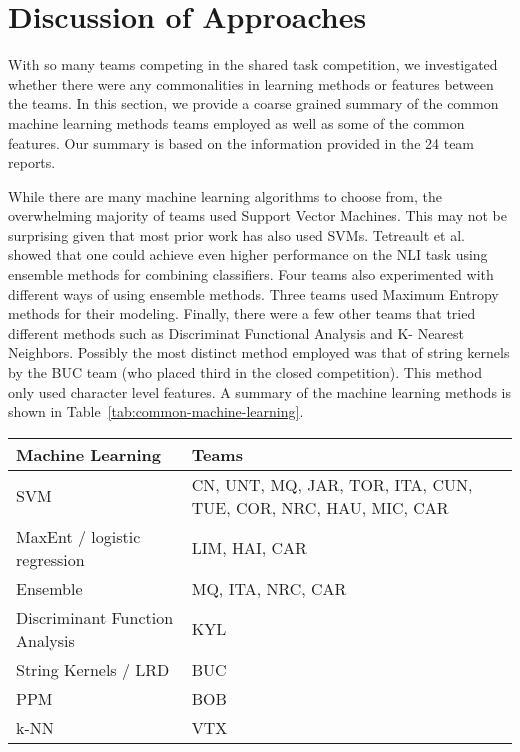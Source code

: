 \documentclass[11pt,letterpaper]{article}
\begin{document}
\section{Discussion of Approaches}
\label{sec-commonalities}
With so many teams competing in the shared task competition, we investigated
whether there were any commonalities in learning methods or features
between the teams.  In this section, we provide a coarse grained summary
of the common machine learning methods teams employed as well as some of
the common features.  Our summary is based on the information provided
in the 24 team reports.

While there are many machine learning algorithms to choose from, the overwhelming
majority of teams used Support Vector Machines.  This may not be surprising
given that most prior work has also used SVMs.  Tetreault et al.
 showed that one could achieve even higher
performance on the NLI task using ensemble methods for combining classifiers.
Four teams also experimented with different ways of using ensemble methods.
Three teams used Maximum Entropy methods for their modeling.
Finally, there were a few other teams that tried different methods such as
Discriminat Functional Analysis and K- Nearest Neighbors.  Possibly the most
distinct method employed was that of string kernels by the BUC team (who placed
third in the closed competition).  This method only used character level features.  
A summary of the machine learning methods is shown in Table~\ref{tab:common-machine-learning}.


\begin{table*}[!ht]
\begin{small}
\begin{tabular}{|l|p{10.5cm}|}
\hline
{\bf Machine Learning} & {\bf Teams} \\  \hline
SVM                    & CN, UNT, MQ, JAR, TOR, ITA, CUN, TUE, COR, NRC, HAU, MIC, CAR  \\ \hline
MaxEnt / logistic regression                 & LIM, HAI, CAR  \\ \hline
Ensemble               & MQ, ITA, NRC, CAR           \\ \hline
Discriminant Function Analysis & KYL \\ \hline
String Kernels / LRD   & BUC          \\ \hline
PPM                    & BOB \\ \hline
k-NN                   & VTX \\ \hline
\end{tabular}
\end{small}
\caption{Machine Learning algorithms used in Shared Task\label{tab:common-machine-learning}}
\end{table*}
\end{document}
